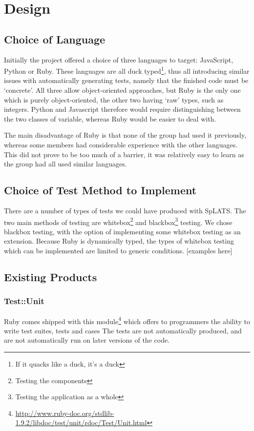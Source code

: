 \chapter{Design}

\section{Choice of Language}
  Initially the project offered a choice of three languages to target: JavaScript, Python or Ruby.
  These languages are all duck typed\footnote{If it quacks like a duck, it's a duck}, thus all introducing similar issues with automatically generating tests, namely that the finished code must be `concrete'.
  All three allow object-oriented approaches, but Ruby is the only one which is purely object-oriented, the other two having `raw' types, such as integers.
  Python and Javascript therefore would require distinguishing between the two classes of variable, whereas Ruby would be easier to deal with.

  The main disadvantage of Ruby is that none of the group had used it previously, whereas some members had considerable experience with the other
  languages. This did not prove to be too much of a barrier, it was relatively easy to learn as the group had all used similar languages.

\section{Choice of Test Method to Implement}
  There are a number of  types of tests we could have produced with SpLATS.
  The two main methods of testing are whitebox\footnote{Testing the components} and blackbox\footnote{Testing the application as a whole} testing.
  We chose blackbox testing, with the option of implementing some whitebox testing as an extension. Because Ruby is dynamically typed, the types of whitebox testing which can be implemented are limited to generic conditions.
  [examples here]

\section{Existing Products}

  \subsection{Test::Unit}
    Ruby comes shipped with this module\footnote{\url{http://www.ruby-doc.org/stdlib-1.9.2/libdoc/test/unit/rdoc/Test/Unit.html}} which offers to programmers the ability to write test suites, tests and cases
    The tests are not automatically produced, and are not automatically run on later versions of the code.

